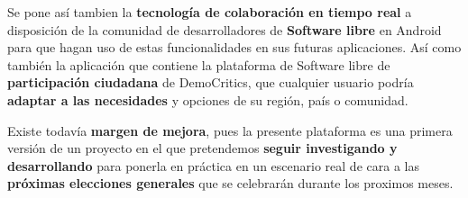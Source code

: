 Se pone así tambien la \textbf{tecnología de colaboración en tiempo real} a disposición de la comunidad de desarrolladores de \textbf{Software libre} en Android para que hagan uso de estas funcionalidades en sus futuras aplicaciones. Así como también la aplicación que contiene la plataforma de Software libre de \textbf{participación ciudadana} de DemoCritics, que cualquier usuario podría \textbf{adaptar a las necesidades} y opciones de su región, país o comunidad.

Existe todavía \textbf{margen de mejora}, pues la presente plataforma es una primera versión de un proyecto en el que pretendemos \textbf{seguir investigando y desarrollando} para ponerla en práctica en un escenario real de cara a las \textbf{próximas elecciones generales} que se celebrarán durante los proximos meses.


